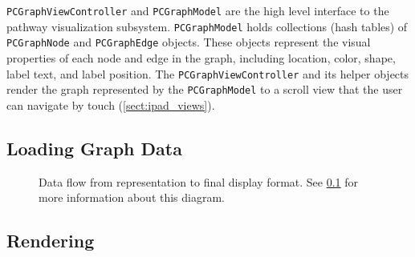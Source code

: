\texttt{PCGraphViewController} and \texttt{PCGraphModel} are the high level
interface to the pathway visualization subsystem. \texttt{PCGraphModel} holds
collections (hash tables) of \texttt{PCGraphNode} and \texttt{PCGraphEdge}
objects. These objects represent the visual properties of each node and edge in
the graph, including location, color, shape, label text, and label position. The
\texttt{PCGraphViewController} and its helper objects render the graph
represented by the \texttt{PCGraphModel} to a scroll view
that the user can navigate by touch (\ref{sect:ipad_views}). 

\subsection{Loading Graph Data}
\label{sect:smda_viz_data}

\begin{figure}[thbp]
    \caption{\label{fig:maw_viz_data} Data flow from \pathcasemaw representation
    to final display format. See \ref{sect:smda_viz_data} for more information
    about this diagram.}
\end{figure}

\subsection{Rendering}
\label{sect:smda_rendering}
